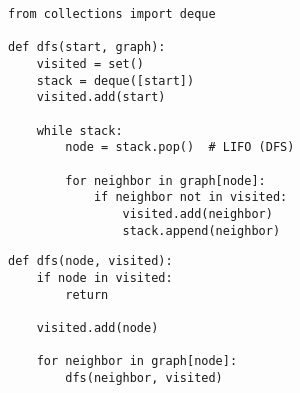 \begin{algo}
\begin{lstlisting}
from collections import deque

def dfs(start, graph):
    visited = set()
    stack = deque([start])
    visited.add(start)

    while stack:
        node = stack.pop()  # LIFO (DFS)

        for neighbor in graph[node]:
            if neighbor not in visited:
                visited.add(neighbor)
                stack.append(neighbor) 
\end{lstlisting}
    \end{algo}

\begin{algo}
\begin{lstlisting}
def dfs(node, visited):
    if node in visited:
        return

    visited.add(node)

    for neighbor in graph[node]:
        dfs(neighbor, visited)
\end{lstlisting}
\end{algo}

\newpage

